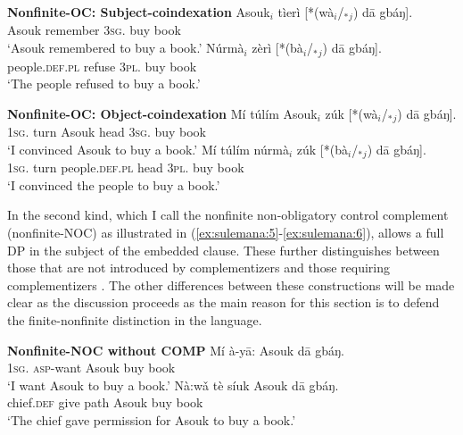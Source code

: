 \documentclass[output=paper,colorlinks,citecolor=brown]{langscibook}
\begin{document}
\ea%
    \label{ex:sulemana:3}
    {\bf{Nonfinite-OC: Subject-coindexation}}
    \ea%
    \label{ex:sulemana:3a}
    \gll    Asouk$_i$ tìerì [*(wà$_i$/$_*${}$_j$) dā gbáŋ]. \\
            Asouk remember \textsc{3sg}. buy book\\
    \glt    `Asouk remembered to buy a book.'
    \ex%
    \label{ex:sulemana:3b}
    \gll    Núrmà$_i$  zèrì [*(bà$_i$/$_*${}$_j$) dā gbáŋ]. \\
            people.\textsc{def.pl} refuse \textsc{3pl}. buy book\\
    \glt    `The people refused to buy a book.'
    \z
\z

\ea%
    \label{ex:sulemana:4}
    {\bf{Nonfinite-OC: Object-coindexation}}
    \ea%
    \label{ex:sulemana:4a}
    \gll    Mí túlím Asouk$_i$ zúk [*(wà$_i$/$_*${}$_j$) dā gbáŋ]. \\
            \textsc{1sg}. turn Asouk head \textsc{3sg}. buy book\\
    \glt    `I convinced Asouk to buy a book.'
    \ex%
    \label{ex:sulemana:4b}
    \gll    Mí túlím núrmà$_i$ zúk [*(bà$_i$/$_*${}$_j$) dā gbáŋ]. \\
            \textsc{1sg}. turn people.\textsc{def.pl} head \textsc{3pl}. buy book\\
    \glt    `I convinced the people to buy a book.' 
    \z
\z

In the second kind, which I call the nonfinite non-obligatory control complement (nonfinite-NOC) as illustrated in (\ref{ex:sulemana:5}-\ref{ex:sulemana:6}),  allows a full DP in the subject of the embedded clause. These further distinguishes between those that are not introduced by complementizers  and those requiring complementizers . The other differences between these constructions will be made clear as the discussion proceeds as the main  reason for this section is to defend the finite-nonfinite distinction in the language. 

\ea%
    \label{ex:sulemana:5}
    {\bf{Nonfinite-NOC without COMP}}
    \ea%
    \label{ex:sulemana:5a}
    \gll    Mí à-yā: Asouk dā gbáŋ.\\
            \textsc{1sg}. \textsc{asp}-want Asouk buy book\\
    \glt    `I want Asouk to buy a book.' 
    \ex%
    \label{ex:sulemana:5b}
    \gll    Nà:wǎ tè síuk Asouk dā gbáŋ. \\
            chief.\textsc{def} give path Asouk buy book\\
    \glt    `The chief gave permission for Asouk to buy a book.' 
    \z
\z
\end{document}
